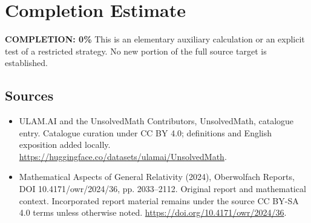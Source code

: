 \documentclass[11pt]{article}
\begin{document}
\section{Completion Estimate}
\noindent\textbf{COMPLETION: 0\%}
This is an elementary auxiliary calculation or an explicit test of a restricted strategy. No new portion of the full source target is established.

\subsection{Sources}
\begin{itemize}
\item[\hypertarget{source:statement:1}{S1}] ULAM.AI and the UnsolvedMath Contributors, UnsolvedMath, catalogue entry. Catalogue curation under CC BY 4.0; definitions and English exposition added locally.
\url{https://huggingface.co/datasets/ulamai/UnsolvedMath}.
\item[\hypertarget{source:statement:2}{S2}] Mathematical Aspects of General Relativity (2024), Oberwolfach Reports, DOI 10.4171/owr/2024/36, pp. 2033--2112. Original report and mathematical context. Incorporated report material remains under the source CC BY-SA 4.0 terms unless otherwise noted.
\url{https://doi.org/10.4171/owr/2024/36}.
\end{itemize}
\label{end:statement}
\end{document}
